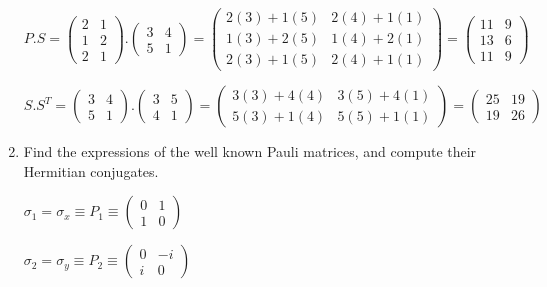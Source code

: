 \documentclass[fleqn]{article}
\begin{document}
\begin{enumerate}
    \noindent
    $P.S=
    \begin{pmatrix}
      2 & 1  \\
      1 & 2  \\
      2 & 1 
    \end{pmatrix}
    .
    \begin{pmatrix}
      3 & 4 \\
      5 & 1 
    \end{pmatrix}
    =
    \begin{pmatrix}
      2(3)+1(5) & 2(4)+1(1)  \\
      1(3)+2(5) & 1(4)+2(1)  \\
      2(3)+1(5) & 2(4)+1(1)
    \end{pmatrix}
    =
    \begin{pmatrix}
      11 & 9  \\
      13 & 6  \\
      11 & 9
    \end{pmatrix}
    $

    \noindent
    $S.S^T=
    \begin{pmatrix}
      3 & 4 \\
      5 & 1
    \end{pmatrix}
    .
    \begin{pmatrix}
      3 & 5 \\
      4 & 1
    \end{pmatrix}
    =
    \begin{pmatrix}
      3(3)+4(4) & 3(5)+4(1) \\
      5(3)+1(4) & 5(5)+1(1)
    \end{pmatrix}
    =
    \begin{pmatrix}
      25 & 19 \\
      19 & 26
    \end{pmatrix}
    $
  
  
  
  \item Find the expressions of the well known Pauli matrices, and compute their Hermitian conjugates. 
  
  $\sigma_1=\sigma_x\equiv P_1 \equiv
  \begin{pmatrix}
    0 & 1 \\
    1 & 0 
  \end{pmatrix}
  $

  $\sigma_2=\sigma_y\equiv P_2 \equiv
  \begin{pmatrix}
    0 & -i \\
    i & 0 
  \end{pmatrix}
  $


\end{enumerate}
\end{document}
